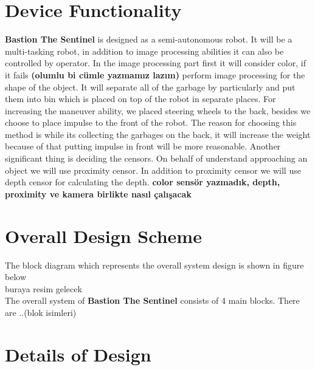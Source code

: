 \documentclass[12pt,a4paper]{article}
\begin{document}
\section{Device Functionality}
 \begin{flushleft}
  \textbf{Bastion The Sentinel} is designed as a semi-autonomous robot. It will be a multi-tasking robot, in addition to 
  image processing abilities it can also be controlled by operator. In the image processing part first it will consider color, 
  if it fails \textbf{(olumlu bi cümle yazmamız lazım)} perform image processing for the shape of the object. It will separate 
  all of the garbage by particularly and put them into bin which is placed on top of the robot in separate places. For increasing 
  the maneuver ability, we placed steering wheels to the back, besides we choose to place impulse to the front of the robot. The 
  reason for choosing this method is while its collecting the garbages on the back, it will increase the weight because of that 
  putting impulse in front will be more reasonable. Another significant thing is deciding the censors. On behalf of understand 
  approaching an object we will use proximity censor. In addition to proximity censor we will use depth censor for calculating 
  the depth. \textbf{color sensör yazmadık, depth, proximity ve kamera birlikte nasıl çalışacak}
 \end{flushleft}
 
 \section{Overall Design Scheme}
 \begin{flushleft}
  The block diagram which represents the overall system design is shown in figure below\\
  buraya resim gelecek\\
  The overall system of \textbf{Bastion The Sentinel} consists of 4 main blocks. There are ..(blok isimleri)
 \end{flushleft}
 
 \section{Details of Design}
  
\end{document}
